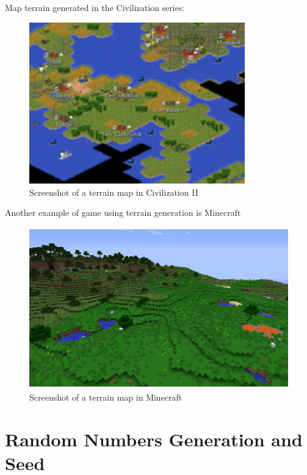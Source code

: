 \documentclass[a4paper,12pt]{book}
\begin{document}
Map terrain generated in the Civilization series:

\begin{figure}
\begin{center}
\includegraphics[height=70mm]{civ-series.png}
\end{center}
\caption{Screenshot of a terrain map in Civilization II}
\label{fig:2.3}
\end{figure}

Another example of game using terrain generation is Minecraft

\begin{figure}
\begin{center}
\includegraphics[height=70mm]{minecraft.jpg}
\end{center}
\caption{Screenshot of a terrain map in Minecraft}
\label{fig:2.4}
\end{figure}

\section{Random Numbers Generation and Seed}
\end{document}
